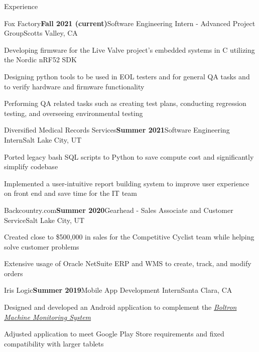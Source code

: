\documentclass{resume}
\begin{document}
\begin{rSection}{\large Experience}

\begin{rSubsection}{Fox Factory}{\bf{Fall 2021 (current)}}{Software Engineering Intern - Advanced Project Group}{Scotts Valley, CA }
\item Developing firmware for the Live Valve project's embedded systems in C utilizing the Nordic nRF52 SDK
\item Designing python tools to be used in EOL testers and for general QA tasks and to verify hardware and firmware functionality
\item Performing QA related tasks such as creating test plans, conducting regression testing, and overseeing environmental testing
\end{rSubsection}

\begin{rSubsection}{Diversified Medical Records Services}{\bf{Summer 2021}}{Software Engineering Intern}{Salt Lake City, UT }
\item Ported legacy bash SQL scripts to Python to save compute cost and significantly simplify codebase
\item Implemented a user-intuitive report building system to improve user experience on front end and save time for the IT team
\end{rSubsection}

\begin{rSubsection}{Backcountry.com}{\bf{Summer 2020}}{Gearhead - Sales Associate and Customer Service}{Salt Lake City, UT }
\item Created close to \$500,000 in sales for the Competitive Cyclist team while helping solve customer problems
\item Extensive usage of Oracle NetSuite ERP and WMS to create, track, and modify orders
\end{rSubsection}

\begin{rSubsection}{Iris Logic}{\bf{Summer 2019}}{Mobile App Development Intern}{Santa Clara, CA }
 \item Designed and developed an Android application to complement the \emph{\href{https://irislogic.com/boltron-machine-monitoring-system/}{Boltron Machine Monitoring System}}
\item Adjusted application to meet Google Play Store requirements and fixed compatibility with larger tablets
\end{rSubsection}

\end{rSection}
\end{document}
